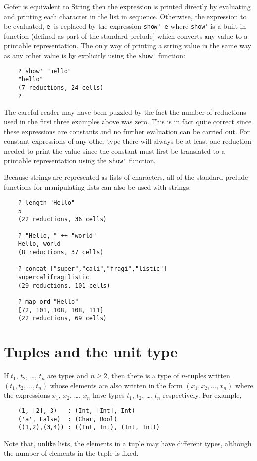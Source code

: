 Gofer is equivalent to String then the expression is  printed  directly
by evaluating and printing each character  in  the  list  in  sequence.
Otherwise, the expression to  be  evaluated,  \verb"e",  is  replaced  by  the
expression \verb"show' e" where \verb"show'"
is a built-in function (defined as  part
of the standard prelude)  which  converts  any  value  to  a  printable
representation.  The  only way of printing a  string value  in the same
way as any other value is by explicitly using the \verb"show'" function:
\begin{verbatim}
    ? show' "hello"
    "hello"
    (7 reductions, 24 cells)
    ?
\end{verbatim}
The careful reader may have been puzzled by  the  fact  the  number  of
reductions used in the first three examples above was zero.  This is in
fact quite correct since these expressions are constants and no further
evaluation can be carried out.  For constant expressions of  any  other
type there will always be at least one reduction needed  to  print  the
value since the constant  must  first  be  translated  to  a  printable
representation using the \verb"show'" function.

Because strings are represented as lists  of  characters,  all  of  the
standard prelude functions for manipulating lists can also be used with
strings:
\begin{verbatim}
    ? length "Hello"
    5
    (22 reductions, 36 cells)

    ? "Hello, " ++ "world"
    Hello, world
    (8 reductions, 37 cells)

    ? concat ["super","cali","fragi","listic"]
    supercalifragilistic
    (29 reductions, 101 cells)

    ? map ord "Hello"
    [72, 101, 108, 108, 111]
    (22 reductions, 69 cells)
\end{verbatim}

\section{Tuples and the unit type}
If $t_1$, $t_2$, \dots, $t_n$ are types and $n\geq 2$,
then there is a type of $n$-tuples
written $(t_1, t_2, \dots, t_n)$ whose elements are also written in  the  form
$(x_1, x_2, \dots, x_n)$ where the expressions $x_1$, $x_2$, \dots, $x_n$
have types  $t_1$,
$t_2$, \dots, $t_n$ respectively. For example,
\begin{verbatim}
    (1, [2], 3)   : (Int, [Int], Int)
    ('a', False)  : (Char, Bool)
    ((1,2),(3,4)) : ((Int, Int), (Int, Int))
\end{verbatim}
Note that, unlike lists, the elements in a  tuple  may  have  different
types, although the number of elements in the tuple is fixed.

